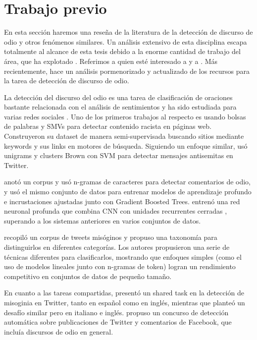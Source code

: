 

\section{Trabajo previo}

En esta sección haremos una reseña de la literatura de la detección de discurso de odio y otros fenómenos similares. Un análisis extensivo de esta disciplina escapa totalmente al alcance de esta tesis debido a la enorme cantidad de trabajo del área, que ha explotado . Referimos a quien esté interesado a \citet{schmidt2017survey} y a \citet{fortuna2018survey}. Más recientemente, \citet{poletto2021resources} hace un análisis pormenorizado y actualizado de los recursos para la tarea de detección de discurso de odio.

La detección del discurso del odio es una tarea de clasificación de oraciones bastante relacionada con el análisis de sentimientos y ha sido estudiada para varias redes sociales \cite{thelwall2008social, pak2010twitter, saleem2017web}. Uno de los primeros trabajos al respecto es \citet{greevy2004classifying} usando bolsas de palabras y SMVs para detectar contenido racista en páginas web. Construyeron su dataset de manera semi-supervisada buscando sitios mediante keywords y sus links en motores de búsqueda. Siguiendo un enfoque similar, \citet{warner2012detecting} usó unigrams y clusters Brown con SVM para detectar mensajes antisemitas en Twitter.

\citet{waseem2016hateful} anotó un corpus y usó n-gramas de caracteres para detectar comentarios de odio, y \citet{badjatiya2017deep} usó el mismo conjunto de datos para entrenar modelos de aprendizaje profundo e incrustaciones ajustadas junto con Gradient Boosted Trees. \citet {zhang2018detecting} entrenó una red neuronal profunda que combina CNN con unidades recurrentes cerradas \cite{cho2014learning}, superando a los sistemas anteriores en varios conjuntos de datos.

\citet{anzovino2018automatic} recopiló un corpus de tweets misóginos y propuso una taxonomía para distinguirlos en diferentes categorías. Los autores propusieron una serie de técnicas diferentes para clasificarlos, mostrando que enfoques simples (como el uso de modelos lineales junto con n-gramas de token) logran un rendimiento competitivo en conjuntos de datos de pequeño tamaño.

En cuanto a las tareas compartidas, \citet{fersini2018overview} presentó un shared task en la detección de misoginia en Twitter, tanto en español como en inglés, mientras que \citet{fersini2018evalitaoverview} planteó un desafío similar pero en italiano e inglés. \citet{bosco2018overview} propuso un concurso de detección automática sobre publicaciones de Twitter y comentarios de Facebook, que incluía discursos de odio en general.

